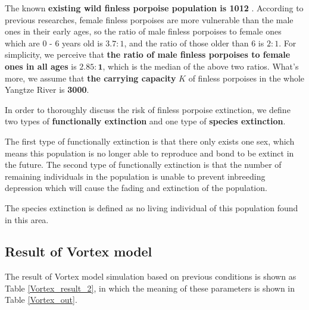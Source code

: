 \documentclass{mcmthesis}
\numberwithin{figure}{section}
\numberwithin{table}{section}
\numberwithin{equation}{section}
\begin{document}
The known \textbf{existing wild finless porpoise population is 1012} \citep{Wubin}. 
According to previous researches, female finless porpoises are more
vulnerable than the male ones in their early ages, so the ratio of 
male finless porpoises to female ones which are 0 - 6 years old is $ 3.7:1 $,
and the ratio of those older than 6 is $ 2:1 $. For simplicity, 
we perceive that \textbf{the ratio of male finless porpoises to female ones
in all ages} is $ \bm{2.85:1} $, which is the median of the above two ratios.
What's more, we assume that \textbf{the carrying capacity} $ K $  of finless porpoises
in the whole Yangtze River is \textbf{3000}.
\par
In order to thoroughly discuss the risk of finless porpoise extinction,
we define two types of \textbf{functionally extinction} and one type
of \textbf{species extinction}. 
\par
The first type of functionally extinction is that there only exists one 
sex, which means this population is no longer able to reproduce and bond 
to be extinct in the future.
The second type of functionally extinction is that the number of 
remaining individuals in the population is unable to prevent inbreeding
depression which will cause the fading and extinction of the population.
\par
The species extinction is defined as no living individual of this population
found in this area. 

\subsection{Result of Vortex model}
The result of Vortex model simulation based on previous conditions 
is shown as Table \ref{Vortex_result_2}, in which the meaning of 
these parameters is shown in Table \ref{Vortex_out}.
\end{document}
